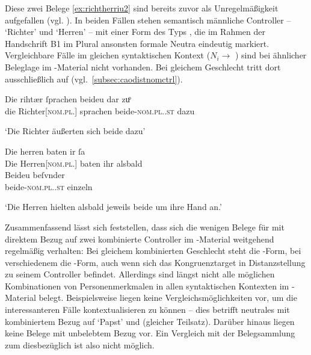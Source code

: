 \label{phsec:richtherriu2}
Diese zwei Belege \cref{ex:richtherriu2} sind bereits zuvor als
Unregelmäßigkeit aufgefallen (vgl. ). In beiden Fällen
stehen semantisch männliche Controller --
 `Richter' und
 `Herren' -- mit einer Form des Typs , die im
Rahmen der Handschrift B1 im Plural ansonsten formale Neutra
eindeutig markiert.
Vergleichbare Fälle im gleichen syntaktischen Kontext
($N_i \to$ ) sind bei ähnlicher Beleglage im
\CAO{}-Material nicht vorhanden. Bei gleichem Geschlecht tritt dort
ausschließlich  auf (vgl.~\cref{subsec:caodistnomctrl}).

\begin{exe}
\ex \label{ex:richtherriu2}
	\begin{xlist}
	\ex \label{ex:richtherriu2_1}
		\gll Die rihtær ſprachen beideu {dar zuͦ} \\
			die Richter[\textsc{nom.pl.\MascM}] sprachen beide-\textsc{nom.pl.\NeutM.st}
			dazu \\
		\begin{taggedline}{\parencites[\pno~28ra,8]{kc:B1}[vgl.~abweichend][10090]{schroeder1895}} %
		\trans `Die Richter äußerten sich beide dazu'
		\end{taggedline}

	\ex \label{ex:richtherriu2_2}
		\gll Die herren baten ir ſa \\
			Die Herren[\textsc{nom.pl.\MascM}] baten ihr alsbald \\
	\sn \gll Beideu beſvnder \\
			beide-\textsc{nom.pl.\NeutM.st} einzeln \\
		\begin{taggedline}{\parencites[\pno~31va,48--49]{kc:B1}[vgl.][11385--11386]{schroeder1895}} %
		\trans `Die Herren hielten alsbald jeweils beide um ihre Hand an.'
		\end{taggedline}
	\end{xlist}
\end{exe}

Zusammenfassend lässt sich feststellen, dass sich die wenigen Belege für
 mit direktem Bezug auf zwei kombinierte Controller im
\KC{}-Material weitgehend regelmäßig verhalten: Bei gleichem
kombinierten Geschlecht steht die -Form, bei verschiedenem die
-Form, auch wenn sich das Kongruenztarget in Distanzstellung zu seinem
Controller befindet. Allerdings sind längst nicht alle möglichen Kombinationen
von Personenmerkmalen in allen syntaktischen Kontexten im
\KC{}-Material belegt. Beispielsweise liegen keine
Vergleichs\-möglich\-keiten vor, um die interessanteren Fälle kontextualisieren
zu können -- dies betrifft neutrales  mit kombiniertem Bezug auf
 `Papst' und  (gleicher Teilsatz). Darüber
hinaus liegen keine Belege mit unbelebtem Bezug vor. Ein Vergleich mit der
Belegsammlung zum \CAO{} diesbezüglich ist also nicht möglich.

